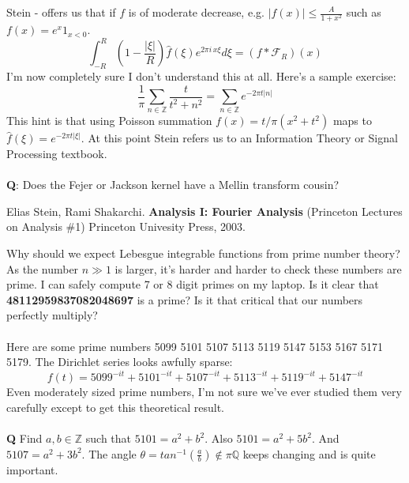 \documentclass[12pt]{article}
\begin{document}
Stein - offers us that if $f$ is of moderate decrease, e.g. $|f(x)| \leq \frac{A}{1 + x^2} $ such as $f(x) = e^x 1_{x < 0} $.
$$ \int_{-R}^R \left( 1 - \frac{|\xi|}{R} \right)\hat{f}(\xi) e^{2\pi i \, x \xi} d\xi = (f * \mathcal{F}_R)(x) $$
I'm now completely sure I don't understand this at all.  Here's a sample exercise:
$$ \frac{1}{\pi} \sum_{n \in \mathbb{Z}} \frac{t}{t^2 + n^2} = \sum_{n \in \mathbb{Z}} e^{-2\pi t |n|}$$
This hint is that using Poisson summation $f(x) = t/\pi(x^2 + t^2)$ maps to $\hat{f}(\xi) = e^{- 2\pi t |\xi|}$.  At this point Stein refers us to an Information Theory or Signal Processing textbook. \\ \\
\textbf{Q}: Does the Fejer or Jackson kernel have a Mellin transform cousin?
\vfill
\begin{thebibliography}{}

\item Elias Stein, Rami Shakarchi. \textbf{Analysis I: Fourier Analysis} (Princeton Lectures on Analysis \#1) Princeton Univesity Press, 2003.
\newpage

\noindent Why should we expect Lebesgue integrable functions from prime number theory?  As the number $n \gg 1$ is larger, it's harder and harder to check these numbers are prime.  I can safely compute 7 or 8 digit primes on my laptop.  Is it clear that \textbf{48112959837082048697} is a prime?  Is it that critical that our numbers perfectly multiply? \\ \\ 
Here are some prime numbers {\color{orange!70!black}5099}   {5101}   {\color{orange!70!black}5107}   {5113}   {\color{orange!70!black}5119}   {5147}   {\color{orange!70!black}5153}   {5167}   {\color{orange!70!black}5171}   {5179}.  The Dirichlet series looks awfully sparse:
$$ f(t) = 
5099^{-it} +
5101^{-it} +
5107^{-it} +
5113^{-it} +
5119^{-it} +
5147^{-it} $$
Even moderately sized prime numbers, I'm not sure we've ever studied them very carefully except to get this theoretical result.  \\ \\
\textbf{Q} Find $a, b \in \mathbb{Z}$ such that $5101 = a^2 + b^2$.   Also $5101 = a^2 + 5b^2$.  And $5107 = a^2 + 3b^2$.  The angle $\theta = tan^{-1}(\frac{a}{b}) \notin \pi \mathbb{Q}$ keeps changing and is quite important. 

\end{thebibliography}
\end{document}
